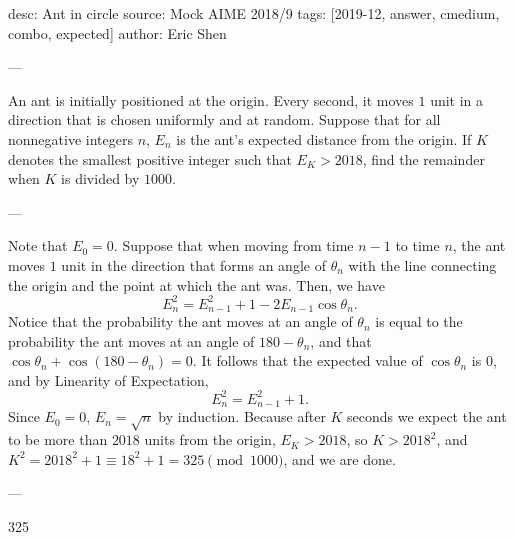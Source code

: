 desc: Ant in circle
source: Mock AIME 2018/9
tags: [2019-12, answer, cmedium, combo, expected]
author: Eric Shen

---

An ant is initially positioned at the origin. Every second, it moves $1$ unit in a direction that is chosen uniformly and at random. Suppose that for all nonnegative integers $n$, $E_n$ is the ant's expected distance from the origin. If $K$ denotes the smallest positive integer such that $E_K>2018$, find the remainder when $K$ is divided by $1000$.

---

Note that $E_0=0$. Suppose that when moving from time $n-1$ to time $n$, the ant moves $1$ unit in the direction that forms an angle of $\theta_n$ with the line connecting the origin and the point at which the ant was. Then, we have \[E_n^2=E_{n-1}^2+1-2E_{n-1}\cos\theta_n.\]
Notice that the probability the ant moves at an angle of $\theta_n$ is equal to the probability the ant moves at an angle of $180-\theta_n$, and that $\cos\theta_n+\cos\left(180-\theta_n\right)=0$. It follows that the expected value of $\cos\theta_n$ is $0$, and by Linearity of Expectation, \[E_n^2=E_{n-1}^2+1.\]
Since $E_0=0$, $E_n=\sqrt{n}$ by induction. Because after $K$ seconds we expect the ant to be more than $2018$ units from the origin, $E_K>2018$, so $K>2018^2$, and $K^2=2018^2+1\equiv 18^2+1=325\pmod{1000}$, and we are done.

---

325
